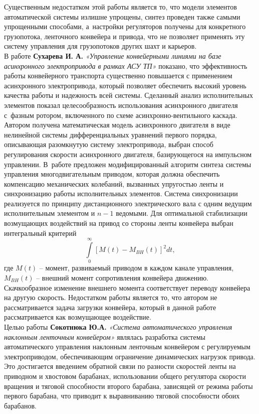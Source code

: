 Существенным недостатком этой работы является то, что модели элементов автоматической системы излишне упрощены, синтез проведен также самыми упрощенными способами, а~настройки регуляторов получены для конкретного грузопотока, ленточного конвейера и привода, что не позволяет применять эту систему управления для грузопотоков других шахт и карьеров.\\

В работе \textbf{Сухарева И. А.} \textit{«Управление конвейерными линиями на базе асинхронного электропривода в рамках АСУ ТП»} \cite{isukharev} показано, что эффективность работы  конвейерного транспорта существенно повышается с применением асинхронного электропривода, который позволяет обеспечить высокий уровень качества работы и надежность всей системы. Сделанный анализ исполнительных элементов показал целесообразность использования асинхронного двигателя с~фазным ротором, включенного по схеме асинхронно-вентильного каскада. Автором получена математическая модель асинхронного двигателя в виде нелинейной системы дифференциальных уравнений первого порядка, описывающая разомкнутую систему электропривода, выбран способ регулирования скорости асинхронного двигателя, базирующегося на импульсном управлении. В~работе предложен модифицированный алгоритм синтеза системы управления многодвигательным приводом, которая должна обеспечить компенсацию механических колебаний, вызванных упругостью ленты и синхронизацию работы исполнительных элементов. Система синхронизации реализуется по принципу дистанционного электрического вала с одним ведущим исполнительным элементом и $n - 1$  ведомыми. Для оптимальной стабилизации возмущающих воздействий на привод со стороны ленты конвейера выбран интегральный критерий
$$
\int\limits_0^\infty [M(t) - M_{BH} (t)]^2 dt,
$$
где $M(t)$ -- момент, развиваемый приводом в каждом канале управления, $M_{BH} (t)$ -- внешний момент сопротивления конвейера движению. Скачкообразное изменение внешнего момента соответствует переводу конвейера на другую скорость.
Недостатком работы является то, что автором не рассматривается задача загрузки конвейера, который в данной работе рассматривается как возмущающее воздействие.\\

Целью работы \textbf{Сокотнюка Ю.А.} \textit{«Система автоматического управления наклонным ленточным конвейером»} \cite{usokotnuk} являлась разработка системы автоматического управления наклонным ленточным конвейером с регулируемым электроприводом, обеспечивающим ограничение динамических нагрузок привода. Это достигается  введением обратной связи по разности скоростей ленты на приводном и хвостовом барабанах, использовании общего регулятора скорости вращения и тяговой способности второго барабана, зависящей от режима работы первого барабана, что приводит к выравниванию тяговой способности обоих барабанов. 

